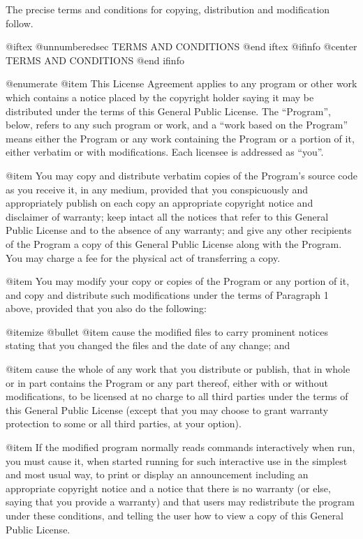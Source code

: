   The precise terms and conditions for copying, distribution and
modification follow.

@iftex
@unnumberedsec TERMS AND CONDITIONS
@end iftex
@ifinfo
@center TERMS AND CONDITIONS
@end ifinfo

@enumerate
@item
This License Agreement applies to any program or other work which
contains a notice placed by the copyright holder saying it may be
distributed under the terms of this General Public License.  The
``Program'', below, refers to any such program or work, and a ``work based
on the Program'' means either the Program or any work containing the
Program or a portion of it, either verbatim or with modifications.  Each
licensee is addressed as ``you''.

@item
You may copy and distribute verbatim copies of the Program's source
code as you receive it, in any medium, provided that you conspicuously and
appropriately publish on each copy an appropriate copyright notice and
disclaimer of warranty; keep intact all the notices that refer to this
General Public License and to the absence of any warranty; and give any
other recipients of the Program a copy of this General Public License
along with the Program.  You may charge a fee for the physical act of
transferring a copy.

@item
You may modify your copy or copies of the Program or any portion of
it, and copy and distribute such modifications under the terms of Paragraph
1 above, provided that you also do the following:

@itemize @bullet
@item
cause the modified files to carry prominent notices stating that
you changed the files and the date of any change; and

@item
cause the whole of any work that you distribute or publish, that
in whole or in part contains the Program or any part thereof, either
with or without modifications, to be licensed at no charge to all
third parties under the terms of this General Public License (except
that you may choose to grant warranty protection to some or all
third parties, at your option).

@item
If the modified program normally reads commands interactively when
run, you must cause it, when started running for such interactive use
in the simplest and most usual way, to print or display an
announcement including an appropriate copyright notice and a notice
that there is no warranty (or else, saying that you provide a
warranty) and that users may redistribute the program under these
conditions, and telling the user how to view a copy of this General
Public License.

